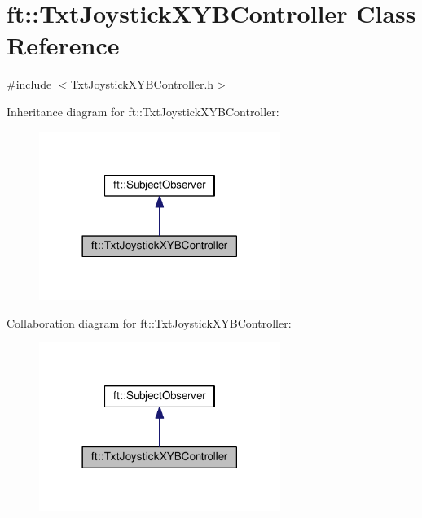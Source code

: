 \hypertarget{classft_1_1_txt_joystick_x_y_b_controller}{}\section{ft\+:\+:Txt\+Joystick\+X\+Y\+B\+Controller Class Reference}
\label{classft_1_1_txt_joystick_x_y_b_controller}


{\ttfamily \#include $<$Txt\+Joystick\+X\+Y\+B\+Controller.\+h$>$}



Inheritance diagram for ft\+:\+:Txt\+Joystick\+X\+Y\+B\+Controller\+:
\nopagebreak
\begin{figure}[H]
\begin{center}
\leavevmode
\includegraphics[width=222pt]{classft_1_1_txt_joystick_x_y_b_controller__inherit__graph}
\end{center}
\end{figure}


Collaboration diagram for ft\+:\+:Txt\+Joystick\+X\+Y\+B\+Controller\+:
\nopagebreak
\begin{figure}[H]
\begin{center}
\leavevmode
\includegraphics[width=222pt]{classft_1_1_txt_joystick_x_y_b_controller__coll__graph}
\end{center}
\end{figure}

